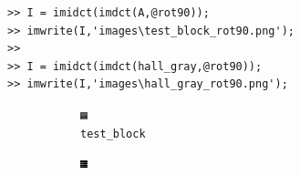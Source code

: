 \documentclass{article}
\numberwithin{figure}{section}
\numberwithin{table}{section}
\numberwithin{listing}{section}
\numberwithin{equation}{section}
\begin{document}
\begin{enumerate}
\begin{itemize}
                        \begin{verbatim}
>> I = imidct(imdct(A,@rot90));
>> imwrite(I,'images\test_block_rot90.png');
>> 
>> I = imidct(imdct(hall_gray,@rot90));
>> imwrite(I,'images\hall_gray_rot90.png');
                        \end{verbatim}

                        \begin{figure}[H]
                            \centering
                            \begin{subfigure}{0.5\textwidth}
                                \centering
                                \includegraphics[width=0.6\linewidth]{test_block}
                                \caption{\texttt{test\_block}}
                            \end{subfigure}%
                            \begin{subfigure}{0.5\textwidth}
                                \centering
                                \includegraphics[width=0.6\linewidth]{test_block_rot90}

\end{subfigure}
\end{figure}
\end{itemize}
\end{enumerate}
\end{document}
